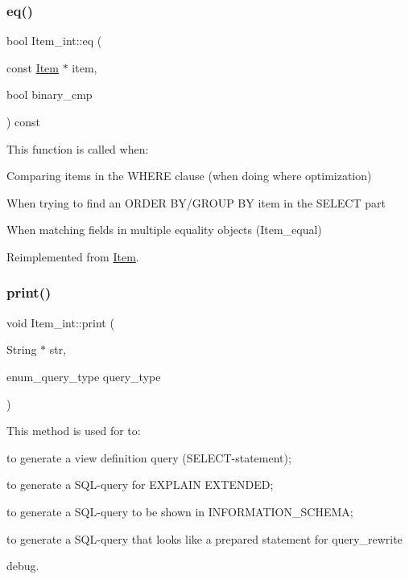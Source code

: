 \subsubsection{\texorpdfstring{eq()}{eq()}}
{\footnotesize\ttfamily bool Item\+\_\+int\+::eq (\begin{DoxyParamCaption}\item[{const \mbox{\hyperlink{classItem}{Item}} $\ast$}]{item,  }\item[{bool}]{binary\+\_\+cmp }\end{DoxyParamCaption}) const\hspace{0.3cm}{\ttfamily [virtual]}}

This function is called when\+:
\begin{DoxyItemize}
\item Comparing items in the W\+H\+E\+RE clause (when doing where optimization)
\item When trying to find an O\+R\+D\+ER B\+Y/\+G\+R\+O\+UP BY item in the S\+E\+L\+E\+CT part
\item When matching fields in multiple equality objects (Item\+\_\+equal) 
\end{DoxyItemize}

Reimplemented from \mbox{\hyperlink{classItem_af0957bbdb9a256de0cd29f1adcae28be}{Item}}.

\mbox{\label{classItem__int_a7c2f1ba97b34b9b3379d49e85d81bdc0}} 
\subsubsection{\texorpdfstring{print()}{print()}}
{\footnotesize\ttfamily void Item\+\_\+int\+::print (\begin{DoxyParamCaption}\item[{String $\ast$}]{str,  }\item[{enum\+\_\+query\+\_\+type}]{query\+\_\+type }\end{DoxyParamCaption})\hspace{0.3cm}{\ttfamily [virtual]}}

This method is used for to\+:
\begin{DoxyItemize}
\item to generate a view definition query (S\+E\+L\+E\+CT-\/statement);
\item to generate a S\+QL-\/query for E\+X\+P\+L\+A\+IN E\+X\+T\+E\+N\+D\+ED;
\item to generate a S\+QL-\/query to be shown in I\+N\+F\+O\+R\+M\+A\+T\+I\+O\+N\+\_\+\+S\+C\+H\+E\+MA;
\item to generate a S\+QL-\/query that looks like a prepared statement for query\+\_\+rewrite
\item debug.
\end{DoxyItemize}

